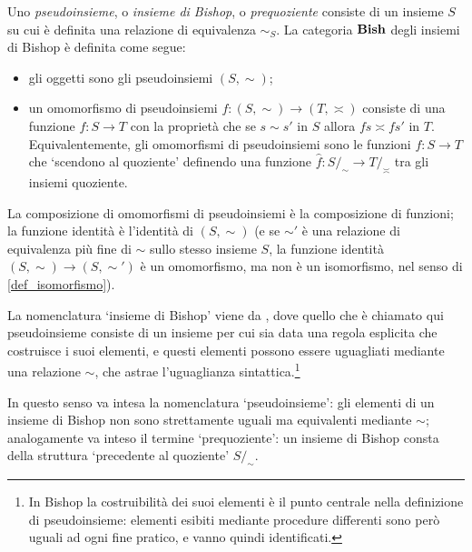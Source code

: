 \begin{example}\label{ex_cat_pseudoinsiemi}
 Uno \emph{pseudoinsieme}, o \emph{insieme di Bishop}, o \emph{prequoziente} consiste di un insieme \(S\) su cui è definita una relazione di equivalenza \(\sim_S\). La categoria \(\mathbf{Bish}\) degli insiemi di Bishop è definita come segue:
 \begin{itemize}
  \item gli oggetti sono gli pseudoinsiemi \((S,\sim)\);
  \item un omomorfismo di pseudoinsiemi \(f \colon (S,\sim) \to (T,\asymp)\) consiste di una funzione \(f \colon S\to T\) con la proprietà che se \(s\sim s'\) in \(S\) allora \(fs\asymp fs'\) in \(T\). Equivalentemente, gli omomorfismi di pseudoinsiemi sono le funzioni \(f \colon S\to T\) che `scendono al quoziente' definendo una funzione \(\hat f \colon S/_{\!\sim} \to T/_{\!\asymp}\) tra gli insiemi quoziente.
 \end{itemize}
 La composizione di omomorfismi di pseudoinsiemi è la composizione di funzioni; la funzione identità è l'identità di \((S,\sim)\) (e se \(\sim'\) è una relazione di equivalenza più fine di \(\sim\) sullo stesso insieme \(S\), la funzione identità \((S,\sim) \to (S,\sim')\) è un omomorfismo, ma non è un isomorfismo, nel senso di \ref{def_isomorfismo}).
\end{example}
\begin{terminology}
 La nomenclatura `insieme di Bishop' viene da \cite{Bishop1985}, dove quello che è chiamato qui pseudoinsieme consiste di un insieme per cui sia data una regola esplicita che costruisce i suoi elementi, e questi elementi possono essere uguagliati mediante una relazione \(\sim\), che astrae l'uguaglianza sintattica.\footnote{In Bishop la costruibilità dei suoi elementi è il punto centrale nella definizione di pseudoinsieme: elementi esibiti mediante procedure differenti sono però uguali ad ogni fine pratico, e vanno quindi identificati.}

 In questo senso va intesa la nomenclatura `pseudoinsieme': gli elementi di un insieme di Bishop non sono strettamente uguali ma equivalenti mediante \(\sim\); analogamente va inteso il termine `prequoziente': un insieme di Bishop consta della struttura `precedente al quoziente' \(S/_{\!\sim}\).
\end{terminology}
